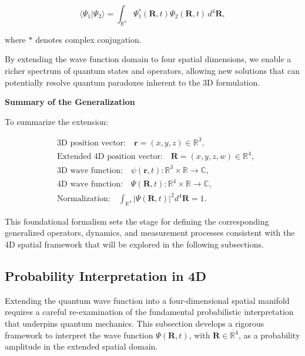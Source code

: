 \documentclass[12pt]{article}
\begin{document}
\begin{equation}
\langle \Psi_1 | \Psi_2 \rangle = \int_{\mathbb{R}^4} \Psi_1^*(\mathbf{R}, t) \Psi_2(\mathbf{R}, t) \, d^4 \mathbf{R},
\label{eq:inner_product}
\end{equation}

where \(*\) denotes complex conjugation.

By extending the wave function domain to four spatial dimensions, we enable a richer spectrum of quantum states and operators, allowing new solutions that can potentially resolve quantum paradoxes inherent to the 3D formulation.

\medskip

\textbf{Summary of the Generalization}

To summarize the extension:

\begin{equation}
\boxed{
\begin{aligned}
& \text{3D position vector:} \quad \mathbf{r} = (x, y, z) \in \mathbb{R}^3, \\
& \text{Extended 4D position vector:} \quad \mathbf{R} = (x, y, z, w) \in \mathbb{R}^4, \\
& \text{3D wave function:} \quad \psi(\mathbf{r}, t) : \mathbb{R}^3 \times \mathbb{R} \to \mathbb{C}, \\
& \text{4D wave function:} \quad \Psi(\mathbf{R}, t) : \mathbb{R}^4 \times \mathbb{R} \to \mathbb{C}, \\
& \text{Normalization:} \quad \int_{\mathbb{R}^4} |\Psi(\mathbf{R}, t)|^2 d^4\mathbf{R} = 1.
\end{aligned}
}
\label{eq:summary_4D_extension}
\end{equation}

This foundational formalism sets the stage for defining the corresponding generalized operators, dynamics, and measurement processes consistent with the 4D spatial framework that will be explored in the following subsections.

\subsection{Probability Interpretation in 4D}

Extending the quantum wave function into a four-dimensional spatial manifold requires a careful re-examination of the fundamental probabilistic interpretation that underpins quantum mechanics. This subsection develops a rigorous framework to interpret the wave function \(\Psi(\mathbf{R}, t)\), with \(\mathbf{R} \in \mathbb{R}^4\), as a probability amplitude in the extended spatial domain.
\end{document}
